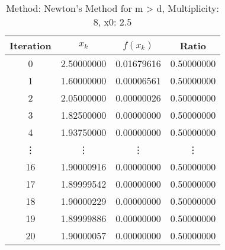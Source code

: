 \begin{table}
\centering
\caption{Method: Newton's Method for m > d, Multiplicity: 8, x0: 2.5}
\label{tab:table_Newton's_Method_for_m_>_d_8_2_5}
\begin{tabular}{c c c c}
\toprule
Iteration &      $x_k$ &   $f(x_k)$ &      Ratio \\
\midrule
        0 & 2.50000000 & 0.01679616 & 0.50000000 \\
        1 & 1.60000000 & 0.00006561 & 0.50000000 \\
        2 & 2.05000000 & 0.00000026 & 0.50000000 \\
        3 & 1.82500000 & 0.00000000 & 0.50000000 \\
        4 & 1.93750000 & 0.00000000 & 0.50000000 \\
   \vdots &     \vdots &     \vdots &     \vdots \\
       16 & 1.90000916 & 0.00000000 & 0.50000000 \\
       17 & 1.89999542 & 0.00000000 & 0.50000000 \\
       18 & 1.90000229 & 0.00000000 & 0.50000000 \\
       19 & 1.89999886 & 0.00000000 & 0.50000000 \\
       20 & 1.90000057 & 0.00000000 & 0.50000000 \\
\bottomrule
\end{tabular}
\end{table}
